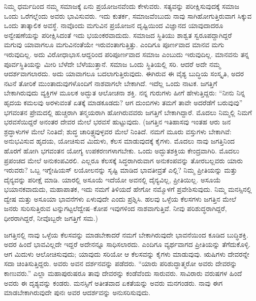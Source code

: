 \vskip 0.2cm

ನಿಮ್ಮ ಧರ್ಮದಿಂದ ನಮ್ಮ ಸಮಾಜಕ್ಕೆ ಏನು ಪ್ರಯೋಜನವೆಂದು ಕೇಳುವರು. ಸತ್ಯವನ್ನು ಪರೀಕ್ಷಿಸುವುದಕ್ಕೆ ಸಮಾಜ ಒಂದು ಒರೆಗಲ್ಲೆಂದು ಅವರು ಭಾವಿಸುವರು. ಇದು ಕುತರ್ಕ, ಸಮಾಜವೆಂಬುದು ನಾವು ಸಾಗಿಹೋಗುತ್ತಿರುವಾಗ ಸಿಕ್ಕುವ ಒಂದು ತಾತ್ಕಾಲಿಕ ಅವಸ್ಥೆ. ನಾವೊಂದು ಮಗುವಿನ ಪ್ರಯೋಜನ ದೃಷ್ಟಿಯಿಂದ ವಿಜ್ಞಾನದ ಯಾವುದಾದರೂ ಅನ್ವೇಷಣೆಯನ್ನು ಪರೀಕ್ಷಿಸಿದಂತೆ ಇದು ಭಯಂಕರವಾದುದು. ಸಮಾಜದ ಸ್ಥಿತಿಯು ಶಾಶ್ವತ ಸ್ವರೂಪದ್ದಾಗಿದ್ದರೆ ಮಗುವು ಯಾವಾಗಲೂ ಮಗುವಿನಂತೆಯೇ ಇರುವಂತಾಗುತ್ತಿತ್ತು. ಎಂದಿಗೂ ಪೂರ್ಣವಾದ ಮಾನವ ಮಗು ಇರುವುದಿಲ್ಲ. ಅದು ವಿರೋಧಾಭಾಸ.\break ಆದ್ದರಿಂದ ಪರಿಪೂರ್ಣವಾದ ಸಮಾಜ ಎಂಬುದು ಇರುವುದಿಲ್ಲ. ಮಾನವನು ತನ್ನ ಪೂರ್ವಸ್ಥಿತಿಯನ್ನು ಮೀರಿ ಬೆಳೆದೇ ಬೆಳೆಯುತ್ತಾನೆ. ಸಮಾಜ ಒಂದು ಸ್ಥಿತಿಯಲ್ಲಿ ಸರಿ. ಆದರೆ ಅದೇ ನಮ್ಮ ಆದರ್ಶವಾಗಲಾರದು. ಅದು ಯಾವಾಗಲೂ ಬದಲಾಗುತ್ತಿರುವುದು. ಈಗಿರುವ ಈ ವೈಶ್ಯ ಬುದ್ಧಿಯ ಸಂಸ್ಕೃತಿ, ಅದರ ನಟನೆ ತೋರಿಕೆ ಮುಂತಾದುವುಗಳೊಂದಿಗೆ ನಾಶವಾಗಲೇ ಬೇಕಾಗಿದೆ. ಇದೆಲ್ಲ ಒಂದು ನಾಟಕ. ಜಗತ್ತಿಗೆ ಬೇಕಾಗಿರುವುದು ವ್ಯಕ್ತಿಗಳ ಮೂಲಕ ಅದ್ಭುತ ಆಲೋಚನಾ ಶಕ್ತಿ. ನನ್ನ ಗುರುಗಳು ಹೀಗೆ ಹೇಳುತ್ತಿದ್ದರು: “ನೀನು ನಿನ್ನ ಹೃದಯ ಕಮಲವು ಅರಳುವಂತೆ ಏತಕ್ಕೆ ಮಾಡಕೂಡದು? ಆಗ ದುಂಬಿಗಳು ತಮಗೆ ತಾವೇ ಅದರೆಡೆಗೆ ಬರುವುವು” ಭಗವಂತನ ಪ್ರೇಮದಲ್ಲಿ ಹುಚ್ಚರಾಗಿ ತನ್ಮಯರಾಗಿ ಹೋಗಿರುವವರು ಜಗತ್ತಿಗೆ ಬೇಕಾಗಿದ್ದಾರೆ. ಮೊದಲು ನಿಮ್ಮಲ್ಲಿ ನಿಮಗೆ ಭರವಸೆಯಿದ್ದರೆ ಅನಂತರ ದೇವರ ಮೇಲೆ ಭರವಸೆ ಹುಟ್ಟುವುದು. (ಜಗತ್ತಿನ ಇತಿಹಾಸವು ಇಂತಹ ಆರು ಜನ ಶ್ರದ್ಧಾಳುಗಳ ಮೇಲೆ ನಿಂತಿದೆ; ಶುದ್ಧ ಚಾರಿತ್ರ್ಯವುಳ್ಳವರ ಮೇಲೆ ನಿಂತಿದೆ. ನಮಗೆ ಮೂರು ವಸ್ತುಗಳು ಬೇಕಾಗಿವೆ: ಅನುಭವಿಸುವ ಹೃದಯ, ಯೋಚಿಸುವ ಮಿದುಳು, ಕೆಲಸ ಮಾಡುವುದಕ್ಕೆ ಕೈಗಳು. ಮೊದಲು ನಾವು ಜಗತ್ತಿನಿಂದ ಹೊರಗೆ ಹೋಗಿ ಭಗವಂತನ ಯೋಗ್ಯ ಉಪಕರಣಗಳಾಗಬೇಕು. ಒಂದು ಅದ್ಭುತಶಕ್ತಿಯ ಕೇಂದ್ರವಾಗಿರಿ. ಮೊದಲು ಪ್ರಪಂಚದ ಮೇಲೆ ಅನುಕಂಪವಿರಲಿ. ಎಲ್ಲರೂ ಕೆಲಸಕ್ಕೆ ಸಿದ್ಧರಾಗಿರುವಾಗ ಅನುಕಂಪವನ್ನು ತೋರಬಲ್ಲವರು ಯಾರು ಇರುವರು? ಒಬ್ಬ ಇಗ್ನೇಷಿಯಸ್​ ಲಯೋಲನನ್ನು ಸೃಷ್ಟಿ ಮಾಡಿದ ಭಾವತೀವ್ರತೆ ಎಲ್ಲಿ? ನಿಮ್ಮ ಪ್ರೀತಿಯನ್ನು ಮತ್ತು ದೈನ್ಯವನ್ನು ಪರೀಕ್ಷೆ ಮಾಡಿ. ಯಾರಲ್ಲಿ ಅಸೂಯೆ ಇದೆಯೋ ಅವನಲ್ಲಿ ದೈನ್ಯವಿಲ್ಲ, ಪ್ರೀತಿಯಿಲ್ಲ. ಅಸೂಯೆ ಭಯಾನಕವಾದುದು, ಮಹಾಪಾತಕ, ಇದು ನಮಗೆ ತಿಳಿಯದೆ ಹೇಗೋ ನಮ್ಮೊಳಗೆ ಪ್ರವೇಶಿಸುವುದು. ನಿಮ್ಮ ಮನಸ್ಸಿನಲ್ಲಿ ದ್ವೇಷ ಮತ್ತು ಅಸೂಯಾ ಭಾವನೆಗಳು ಏಳುವುದೇ ಎಂದು ಪ್ರಶ್ನಿಸಿ. ಹಲವು ಒಳ್ಳೆಯ ಕೆಲಸಗಳು ಜಗತ್ತಿನ ಮೇಲೆ ಜನರು ಸುರಿಸುತ್ತಿರುವ ಟನ್ನುಗಟ್ಟಲೆ\break ದ್ವೇಷ–ಕೋಪ ಇವುಗಳಿಂದ ನಾಶವಾಗುತ್ತಿವೆ. ನೀವು ಪರಿಶುದ್ಧರಾಗಿದ್ದರೆ, ಧೀರರಾಗಿದ್ದರೆ, ನೀವೊಬ್ಬರೇ ಜಗತ್ತಿಗೆ ಸಮ.)

\vskip 0.2cm

ಜಗತ್ತಿನಲ್ಲಿ ನಾವು ಒಳ್ಳೆಯ ಕೆಲಸವನ್ನು ಮಾಡಬೇಕಾದರೆ ನಮಗೆ ಬೇಕಾಗಿರುವುದೇ ಭಾವನೆಯಿಂದ ಕೂಡಿದ ಬುದ್ಧಿಶಕ್ತಿ. ಅದರ ಹಿಂದೆ ಭಾವವಿಲ್ಲದೇ ಇದ್ದರೆ ಅದೇನನ್ನೂ ಸಾಧಿಸಲಾರದು. ಎಂದಿಗೂ ವ್ಯರ್ಥವಾಗದ ಪ್ರೀತಿಯನ್ನು ತೆಗೆದುಕೊಳ್ಳಿ. ಆಗ ಮಿದುಳು ಆಲೋಚಿಸುವುದು; ಯಾವುದು ಸರಿಯೋ ಆ ಕೆಲಸವನ್ನು ಕೈಗಳು ಮಾಡುವುವು. ಋಷಿಗಳು ದೇವರನ್ನೇ ಸದಾ ಚಿಂತಿಸುತ್ತಿದ್ದರು. ಅವರು ಅವನ ದರ್ಶನವನ್ನು ಪಡೆದರು. “ಯಾರು ಪರಿಶುದ್ಧಾತ್ಮರೋ ಅವರು ದೇವರನ್ನು ಕಾಣುವರು.” ಎಲ್ಲಾ ಮಹಾಪುರುಷರೂ ತಾವು ದೇವರನ್ನು ಕಂಡೆವೆಂದು ಸಾರುವರು. ಸಾವಿರಾರು ವರುಷಗಳ ಹಿಂದೆ ಅವರು ಈ ದೃಶ್ಯವನ್ನು ಕಂಡರು. ಮನಸ್ಸಿಗೆ ಅತೀತವಾದ ಏಕತೆಯನ್ನು ಅವರು ಮನಗಂಡರು. ನಾವು ಈಗ ಮಾಡಬೇಕಾಗಿರುವುದೇ ಪುನಃ ಅವರ ಆದರ್ಶವನ್ನು ಅನುಸರಿಸುವುದು.

